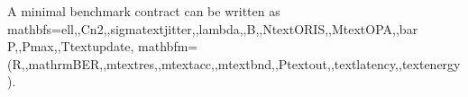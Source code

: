 {}A minimal benchmark contract can be written as\markdownRendererParagraphSeparator
{}\markdownRendererDollarSign{}\markdownRendererDollarSign{}\markdownRendererSoftLineBreak
{}\markdownRendererBackslash{}mathbf\markdownRendererLeftBrace{}s\markdownRendererRightBrace{}=\markdownRendererLeftBrace{}\markdownRendererBackslash{}ell,,C\markdownRendererUnderscore{}n\markdownRendererCircumflex{}2,,\markdownRendererBackslash{}sigma\markdownRendererUnderscore{}\markdownRendererLeftBrace{}\markdownRendererBackslash{}text\markdownRendererLeftBrace{}jitter\markdownRendererRightBrace{}\markdownRendererRightBrace{},,\markdownRendererBackslash{}lambda,,B,,N\markdownRendererUnderscore{}\markdownRendererLeftBrace{}\markdownRendererBackslash{}text\markdownRendererLeftBrace{}ORIS\markdownRendererRightBrace{}\markdownRendererRightBrace{},,M\markdownRendererUnderscore{}\markdownRendererLeftBrace{}\markdownRendererBackslash{}text\markdownRendererLeftBrace{}OPA\markdownRendererRightBrace{}\markdownRendererRightBrace{},,\markdownRendererBackslash{}bar P,,P\markdownRendererUnderscore{}\markdownRendererLeftBrace{}\markdownRendererBackslash{}max\markdownRendererRightBrace{},,T\markdownRendererUnderscore{}\markdownRendererLeftBrace{}\markdownRendererBackslash{}text\markdownRendererLeftBrace{}update\markdownRendererRightBrace{}\markdownRendererRightBrace{}\markdownRendererRightBrace{},\markdownRendererSoftLineBreak
{}\markdownRendererDollarSign{}\markdownRendererDollarSign{}\markdownRendererSoftLineBreak
{}\markdownRendererDollarSign{}\markdownRendererDollarSign{}\markdownRendererSoftLineBreak
{}\markdownRendererBackslash{}mathbf\markdownRendererLeftBrace{}m\markdownRendererRightBrace{}=(R,,\markdownRendererBackslash{}mathrm\markdownRendererLeftBrace{}BER\markdownRendererRightBrace{},,m\markdownRendererUnderscore{}\markdownRendererLeftBrace{}\markdownRendererBackslash{}text\markdownRendererLeftBrace{}res\markdownRendererRightBrace{}\markdownRendererRightBrace{},,m\markdownRendererUnderscore{}\markdownRendererLeftBrace{}\markdownRendererBackslash{}text\markdownRendererLeftBrace{}acc\markdownRendererRightBrace{}\markdownRendererRightBrace{},,m\markdownRendererUnderscore{}\markdownRendererLeftBrace{}\markdownRendererBackslash{}text\markdownRendererLeftBrace{}bnd\markdownRendererRightBrace{}\markdownRendererRightBrace{},,P\markdownRendererUnderscore{}\markdownRendererLeftBrace{}\markdownRendererBackslash{}text\markdownRendererLeftBrace{}out\markdownRendererRightBrace{}\markdownRendererRightBrace{},,\markdownRendererBackslash{}text\markdownRendererLeftBrace{}latency\markdownRendererRightBrace{},,\markdownRendererBackslash{}text\markdownRendererLeftBrace{}energy\markdownRendererRightBrace{}).\markdownRendererSoftLineBreak
